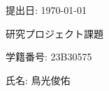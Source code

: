 \begin{titlepage}
    \begin{center}

        {\Large 提出日: \today}

        

        \vspace{40truept}

        

        \vspace*{180truept}

        {\Huge 研究プロジェクト課題} 
        \vspace{10truept}

        {\Huge }
        \vspace{160truept}


        {\Large 学籍番号: 23B30575}
        \vspace{10truept}

        \vspace{10truept}
        {\Large 氏名: 鳥光俊佑} 
        \vspace{10truept}

        {\Large }  

    \end{center}
\end{titlepage}